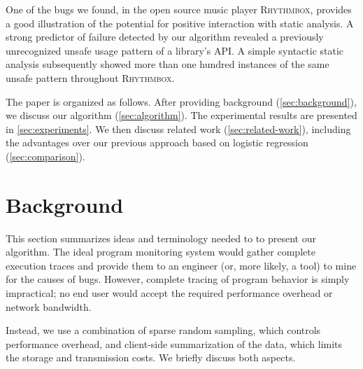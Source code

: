 \documentclass[draft]{sig-alternate}
\newcommand{\rhythmbox}{\textsc{Rhythmbox}\xspace}
\begin{document}
One of the bugs we found, in the open source music player \rhythmbox,
provides a good illustration of the potential for positive interaction
with static analysis.  A strong predictor of failure detected by our
algorithm revealed a previously unrecognized unsafe usage pattern of a
library's API\@.  A simple syntactic static analysis subsequently showed
more than one hundred instances of the same unsafe pattern throughout
\rhythmbox.

The paper is organized as follows.  After providing background
(\autoref{sec:background}), we discuss our algorithm
(\autoref{sec:algorithm}). The experimental results are presented in
\autoref{sec:experiments}.  We then discuss related
work (\autoref{sec:related-work}), including the advantages over our
previous approach based on logistic regression
(\autoref{sec:comparison}).


\section{Background}
\label{sec:background}

This section summarizes ideas and terminology needed to to present our
algorithm.  The ideal program monitoring system would gather complete
execution traces and provide them to an engineer (or, more likely, a
tool) to mine for the causes of bugs.  However, complete tracing of
program behavior is simply impractical; no end user would accept the
required performance overhead or network bandwidth.

Instead, we use a combination of sparse random sampling, which controls
performance overhead, and client-side summarization of the data, which
limits the storage and transmission costs.  We briefly discuss
both aspects.
\end{document}
